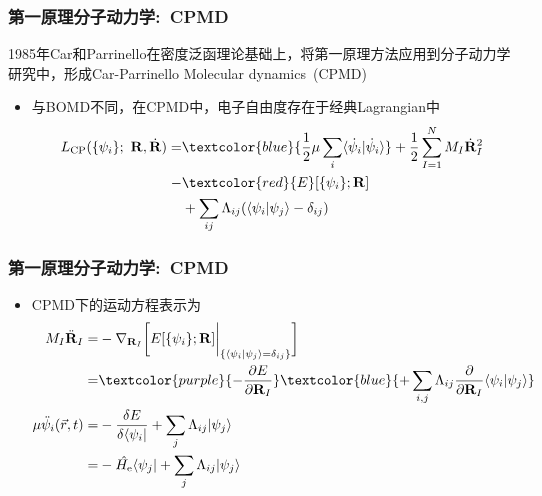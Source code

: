 \frame
{
	\frametitle{第一原理分子动力学:~\textrm{CPMD}}
	1985年\textrm{Car}和\textrm{Parrinello}在密度泛函理论基础上，将第一原理方法应用到分子动力学研究中，形成\textrm{Car-Parrinello Molecular dynamics~(CPMD)}
	\begin{itemize}
		\item 与\textrm{BOMD}不同，在\textrm{CPMD}中，电子自由度存在于经典\textrm{Lagrangian}中
			\begin{displaymath}
				\begin{aligned}
					L_{\mathrm{CP}}(\{\psi_i\};~\mathbf{R},\dot{\mathbf{R}})=&\textcolor{blue}{\dfrac12\mu\sum_i\langle\dot{\psi}_i|\dot{\psi}_i\rangle}+\dfrac12\sum_{I=1}^NM_I\dot{\mathbf{R}}^2_I\\
					-&\textcolor{red}{E}[\{\psi_i\};\mathbf{R}]\\
					&+\sum_{ij}\Lambda_{ij}(\langle\psi_i|\psi_j\rangle-\delta_{ij})
				\end{aligned}
			\end{displaymath}
			{\fontsize{6.2pt}{4.2pt}}
	\end{itemize}
}

\frame
{
	\frametitle{第一原理分子动力学:~\textrm{CPMD}}
	\begin{itemize}
		\item \textrm{CPMD}下的运动方程表示为
			\begin{displaymath}
				\begin{aligned}
					M_I\ddot{\mathbf{R}}_I=&-\nabla_{\mathbf{R}_I}\bigg[E[\{\psi_i\};\mathbf{R}]\bigg|_{\{\langle\psi_i|\psi_j\rangle=\delta_{ij}\}}\bigg]\\
					=&\textcolor{purple}{-\dfrac{\partial E}{\partial\mathbf{R}_I}}\textcolor{blue}{+\sum_{i,j}\Lambda_{ij}\dfrac{\partial}{\partial \mathbf{R}_I}\langle\psi_i|\psi_j\rangle}\\
					\mu\ddot{\psi}_i(\vec r,t)=&-\dfrac{\delta E}{\delta\langle\psi_i|}+\sum_j\Lambda_{ij}|\psi_j\rangle\\
					=&-\hat{H_{\mathrm{e}}}\langle\psi_j|+\sum_j\Lambda_{ij}|\psi_j\rangle
				\end{aligned}
			\end{displaymath}
			{\fontsize{6.2pt}{4.2pt}}
	\end{itemize}
}

